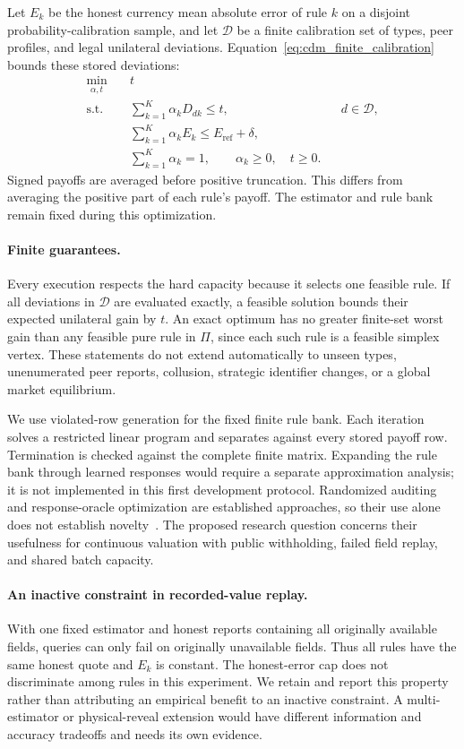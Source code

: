 Let $E_k$ be the honest currency mean absolute error of rule $k$ on a disjoint
probability-calibration sample, and let $\mathcal{D}$ be a finite calibration
set of types, peer profiles, and legal unilateral deviations.
Equation~\eqref{eq:cdm_finite_calibration} bounds these stored deviations:
\begin{align}
\min_{\alpha,t}\quad &t \nonumber\\
\text{s.t.}\quad &\sum_{k=1}^K\alpha_kD_{dk}\leq t,
                   && d\in\mathcal{D},\nonumber\\
&\sum_{k=1}^K\alpha_kE_k\leq E_{\mathrm{ref}}+\delta,\nonumber\\
&\sum_{k=1}^K\alpha_k=1,\qquad\alpha_k\geq0,\quad t\geq0.
\label{eq:cdm_finite_calibration}
\end{align}
Signed payoffs are averaged before positive truncation. This differs from
averaging the positive part of each rule's payoff. The estimator and rule bank
remain fixed during this optimization.

\paragraph{Finite guarantees.}
Every execution respects the hard capacity because it selects one feasible
rule. If all deviations in $\mathcal{D}$ are evaluated exactly, a feasible
solution bounds their expected unilateral gain by $t$. An exact optimum has
no greater finite-set worst gain than any feasible pure rule in $\Pi$, since
each such rule is a feasible simplex vertex. These statements do not extend
automatically to unseen types, unenumerated peer reports, collusion, strategic
identifier changes, or a global market equilibrium.

We use violated-row generation for the fixed finite rule bank. Each iteration
solves a restricted linear program and separates against every stored payoff
row. Termination is checked against the complete finite matrix. Expanding the
rule bank through learned responses would require a separate approximation
analysis; it is not implemented in this first development protocol. Randomized
auditing and response-oracle optimization are established approaches, so their
use alone does not establish novelty~\cite{jain2011doubleoracle,ebrahimi2026audit}.
The proposed research question concerns
their usefulness for continuous valuation with public withholding, failed
field replay, and shared batch capacity.

\paragraph{An inactive constraint in recorded-value replay.}
With one fixed estimator and honest reports containing all originally available
fields, queries can only fail on originally unavailable fields. Thus all rules
have the same honest quote and $E_k$ is constant. The honest-error cap does not
discriminate among rules in this experiment. We retain and report this property
rather than attributing an empirical benefit to an inactive constraint. A
multi-estimator or physical-reveal extension would have different information
and accuracy tradeoffs and needs its own evidence.

